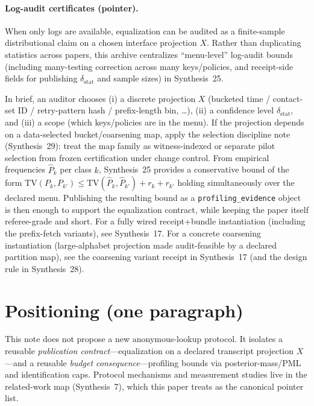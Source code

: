 \documentclass[11pt]{article}
\newcommand{\TV}{\mathrm{TV}}
\begin{document}
\paragraph{Log-audit certificates (pointer).}
When only logs are available, equalization can be audited as a finite-sample distributional claim on a chosen interface projection $X$.
Rather than duplicating statistics across papers, this archive centralizes ``menu-level'' log-audit bounds (including many-testing correction across many keys/policies, and receipt-side fields for publishing $\delta_{\mathrm{stat}}$ and sample sizes) in Synthesis~25.\cite{series:stataudit}

In brief, an auditor chooses (i) a discrete projection $X$ (bucketed time / contact-set ID / retry-pattern hash / prefix-length bin, \dots), (ii) a confidence level $\delta_{\mathrm{stat}}$, and (iii) a scope (which keys/policies are in the menu).
If the projection depends on a data-selected bucket/coarsening map, apply the selection discipline note (Synthesis~29): treat the map family as witness-indexed or separate pilot selection from frozen certification under change control.\cite{series:selectiondiscipline}
From empirical frequencies $\widehat P_k$ per class $k$, Synthesis~25 provides a conservative bound of the form
$\TV(P_k,P_{k'}) \le \TV(\widehat P_k,\widehat P_{k'}) + r_k + r_{k'}$
holding simultaneously over the declared menu.
Publishing the resulting bound as a \texttt{profiling\_evidence} object is then enough to support the equalization contract, while keeping the paper itself referee-grade and short.
For a fully wired receipt+bundle instantiation (including the prefix-fetch variants), see Synthesis~17.\cite{series:workedexample}
For a concrete coarsening instantiation (large-alphabet projection made audit-feasible by a declared partition map), see the coarsening variant receipt in Synthesis~17 (and the design rule in Synthesis~28).\cite{series:coarsening}

\section{Positioning (one paragraph)}
This note does not propose a new anonymous-lookup protocol.
It isolates a reusable \emph{publication contract}---equalization on a declared transcript projection $X$---and a reusable \emph{budget consequence}---profiling bounds via posterior-mass/PML and identification caps.
Protocol mechanisms and measurement studies live in the related-work map (Synthesis~7), which this paper treats as the canonical pointer list.\cite{series:relatedworkmap}
\end{document}
